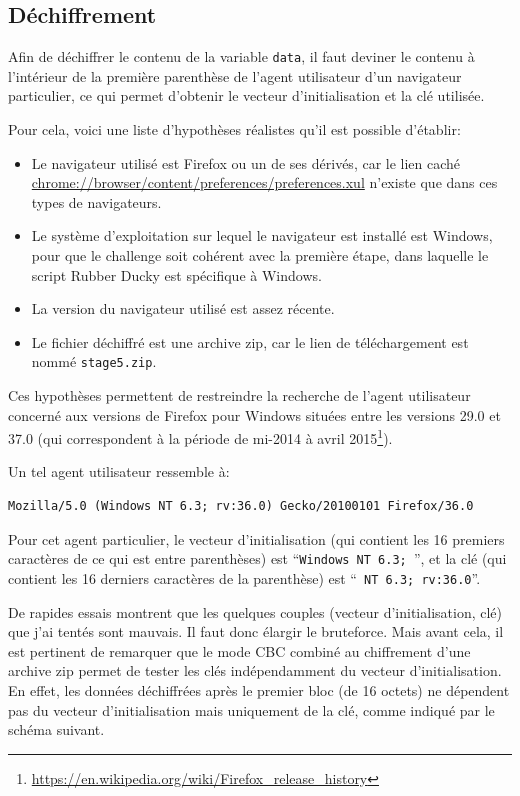 \documentclass[a4paper,10pt]{article}
\begin{document}
\subsection{Déchiffrement}

Afin de déchiffrer le contenu de la variable \texttt{data}, il faut deviner le contenu à l'intérieur de la première parenthèse de l'agent utilisateur d'un navigateur particulier, ce qui permet d'obtenir le vecteur d'initialisation et la clé utilisée.

Pour cela, voici une liste d'hypothèses réalistes qu'il est possible d'établir:
\begin{itemize}
  \item Le navigateur utilisé est Firefox ou un de ses dérivés, car le lien caché \url{chrome://browser/content/preferences/preferences.xul} n'existe que dans ces types de navigateurs.
  \item Le système d'exploitation sur lequel le navigateur est installé est Windows, pour que le challenge soit cohérent avec la première étape, dans laquelle le script Rubber Ducky est spécifique à Windows.
  \item La version du navigateur utilisé est assez récente.
  \item Le fichier déchiffré est une archive zip, car le lien de téléchargement est nommé \texttt{stage5.zip}.
\end{itemize}

Ces hypothèses permettent de restreindre la recherche de l'agent utilisateur concerné aux versions de Firefox pour Windows situées entre les versions 29.0 et 37.0 (qui correspondent à la période de mi-2014 à avril 2015\footnote{\url{https://en.wikipedia.org/wiki/Firefox_release_history}}).

Un tel agent utilisateur ressemble à:
\begin{verbatim}
Mozilla/5.0 (Windows NT 6.3; rv:36.0) Gecko/20100101 Firefox/36.0
\end{verbatim}

Pour cet agent particulier, le vecteur d'initialisation (qui contient les 16 premiers caractères de ce qui est entre parenthèses) est ``\texttt{Windows NT 6.3; }'', et la clé (qui contient les 16 derniers caractères de la parenthèse) est ``\texttt{ NT 6.3; rv:36.0}''.

De rapides essais montrent que les quelques couples (vecteur d'initialisation, clé) que j'ai tentés sont mauvais.
Il faut donc élargir le bruteforce.
Mais avant cela, il est pertinent de remarquer que le mode CBC combiné au chiffrement d'une archive zip permet de tester les clés indépendamment du vecteur d'initialisation.
En effet, les données déchiffrées après le premier bloc (de 16 octets) ne dépendent pas du vecteur d'initialisation mais uniquement de la clé, comme indiqué par le schéma suivant.
\end{document}
